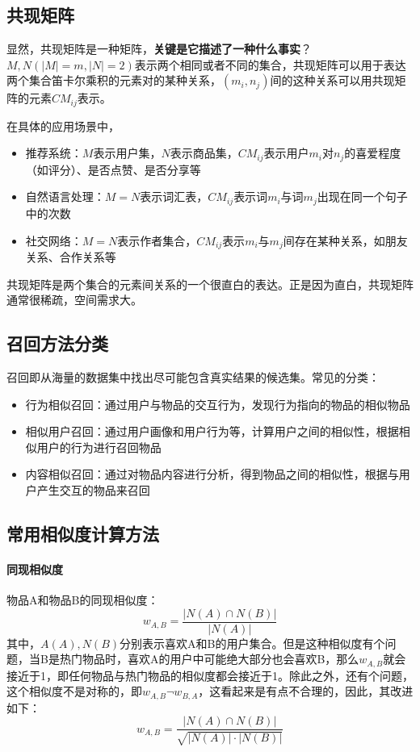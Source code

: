 \subsection{共现矩阵}
显然，共现矩阵是一种矩阵，\textbf{关键是它描述了一种什么事实}？$M, N(|M| = m, |N| = 2)$表示两个相同或者不同的集合，共现矩阵可以用于表达两个集合笛卡尔乘积的元素对的某种关系，$(m_i, n_j)$间的这种关系可以用共现矩阵的元素$CM_{ij}$表示。

在具体的应用场景中，
\begin{itemize}
	\item 推荐系统：$M$表示用户集，$N$表示商品集，$CM_{ij}$表示用户$m_i$对$n_j$的喜爱程度（如评分）、是否点赞、是否分享等
	\item 自然语言处理：$M = N$表示词汇表，$CM_{ij}$表示词$m_i$与词$m_j$出现在同一个句子中的次数
	\item 社交网络：$M=N$表示作者集合，$CM_{ij}$表示$m_i$与$m_j$间存在某种关系，如朋友关系、合作关系等
\end{itemize}
共现矩阵是两个集合的元素间关系的一个很直白的表达。正是因为直白，共现矩阵通常很稀疏，空间需求大。

\subsection{召回方法分类}
召回即从海量的数据集中找出尽可能包含真实结果的候选集。常见的分类：
\begin{itemize}
	\item 行为相似召回：通过用户与物品的交互行为，发现行为指向的物品的相似物品
	\item 相似用户召回：通过用户画像和用户行为等，计算用户之间的相似性，根据相似用户的行为进行召回物品
	\item 内容相似召回：通过对物品内容进行分析，得到物品之间的相似性，根据与用户产生交互的物品来召回
\end{itemize}


\subsection{常用相似度计算方法}
\paragraph{同现相似度}
物品A和物品B的同现相似度：
$$
w_{A,B} = \frac{|N(A) \cap N(B)|}{|N(A)|}
$$
其中，$A(A), N(B)$分别表示喜欢A和B的用户集合。但是这种相似度有个问题，当B是热门物品时，喜欢A的用户中可能绝大部分也会喜欢B，那么$w_{A,B}$就会接近于1，即任何物品与热门物品的相似度都会接近于1。除此之外，还有个问题，这个相似度不是对称的，即$w_{A,B} \neg w_{B,A}$，这看起来是有点不合理的，因此，其改进如下：
$$
w_{A,B} = \frac{|N(A) \cap N(B)|}{\sqrt{|N(A)| \cdot |N(B)|}}
$$

